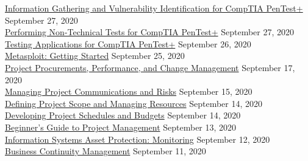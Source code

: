 \documentclass[10pt]{res} %
\begin{document}
\begin{resume}
\href{https://bjdelacruz.dev/files/certificates/pluralsight/5_Information_Gathering_and_Vulnerability_Identification_for_CompTIA_PenTest.pdf}{\color{blue}Information Gathering and Vulnerability Identification for CompTIA PenTest+} \hfill September 27, 2020 \\
\href{https://bjdelacruz.dev/files/certificates/pluralsight/3_Performing_Non_Technical_Tests_for_CompTIA_PenTest.pdf}{\color{blue}Performing Non-Technical Tests for CompTIA PenTest+} \hfill September 27, 2020 \\
\href{https://bjdelacruz.dev/files/certificates/pluralsight/8_Testing_Applications_for_CompTIA_PenTest.pdf}{\color{blue}Testing Applications for CompTIA PenTest+} \hfill September 26, 2020 \\
\href{https://bjdelacruz.dev/files/certificates/pluralsight/Metasploit_Getting_Started.pdf}{\color{blue}Metasploit: Getting Started} \hfill September 25, 2020 \\
\href{https://bjdelacruz.dev/files/certificates/pluralsight/5_Project_Procurements_Performance_and_Change_Management.pdf}{\color{blue}Project Procurements, Performance, and Change Management} \hfill September 17, 2020 \\
\href{https://bjdelacruz.dev/files/certificates/pluralsight/4_Managing_Project_Communications_and_Risks.pdf}{\color{blue}Managing Project Communications and Risks} \hfill September 15, 2020 \\
\href{https://bjdelacruz.dev/files/certificates/pluralsight/2_Defining_Project_Scope_and_Managing_Resources.pdf}{\color{blue}Defining Project Scope and Managing Resources} \hfill September 14, 2020 \\
\href{https://bjdelacruz.dev/files/certificates/pluralsight/3_Developing_Project_Schedules_and_Budgets.pdf}{\color{blue}Developing Project Schedules and Budgets} \hfill September 14, 2020 \\
\href{https://bjdelacruz.dev/files/certificates/pluralsight/1_Beginners_Guide_to_Project_Management.pdf}{\color{blue}Beginner's Guide to Project Management} \hfill September 13, 2020 \\
\href{https://bjdelacruz.dev/files/certificates/pluralsight/12_Information_Systems_Asset_Protection_Monitoring.pdf}{\color{blue}Information Systems Asset Protection: Monitoring} \hfill September 12, 2020 \\
\href{https://bjdelacruz.dev/files/certificates/pluralsight/8_Business_Continuity_Management.pdf}{\color{blue}Business Continuity Management} \hfill September 11, 2020 \\

\end{resume}
\end{document}
